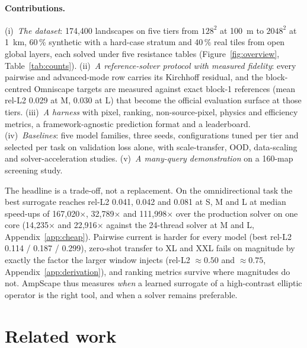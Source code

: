 \documentclass{article}
\newcommand{\relltwo}{rel-L2}
\begin{document}
\paragraph{Contributions.} (i)~\emph{The dataset}: 174,400 landscapes on five tiers from $128^2$ at 100~m to $2048^2$ at 1~km, 60\,\% synthetic with a hard-case stratum and 40\,\% real tiles from open global layers, each solved under five resistance tables (Figure~\ref{fig:overview}, Table~\ref{tab:counts}). (ii)~\emph{A reference-solver protocol with measured fidelity}: every pairwise and advanced-mode row carries its Kirchhoff residual, and the block-centred Omniscape targets are measured against exact block-1 references (mean \relltwo{} 0.029 at M, 0.030 at L) that become the official evaluation surface at those tiers. (iii)~\emph{A harness} with pixel, ranking, non-source-pixel, physics and efficiency metrics, a framework-agnostic prediction format and a leaderboard. (iv)~\emph{Baselines}: five model families, three seeds, configurations tuned per tier and selected per task on validation loss alone, with scale-transfer, OOD, data-scaling and solver-acceleration studies. (v)~\emph{A many-query demonstration} on a 160-map screening study.

The headline is a trade-off, not a replacement. On the omnidirectional task the best surrogate reaches \relltwo{} 0.041, 0.042 and 0.081 at S, M and L at median speed-ups of 167,020$\times$, 32,789$\times$ and 111,998$\times$ over the production solver on one core (14,235$\times$ and 22,916$\times$ against the 24-thread solver at M and L, Appendix~\ref{app:cheap}). Pairwise current is harder for every model (best \relltwo{} 0.114 / 0.187 / 0.299), zero-shot transfer to XL and XXL fails on magnitude by exactly the factor the larger window injects (\relltwo{} $\approx 0.50$ and $\approx 0.75$, Appendix~\ref{app:derivation}), and ranking metrics survive where magnitudes do not. AmpScape thus measures \emph{when} a learned surrogate of a high-contrast elliptic operator is the right tool, and when a solver remains preferable.

\section{Related work}
\label{sec:related}
\end{document}
